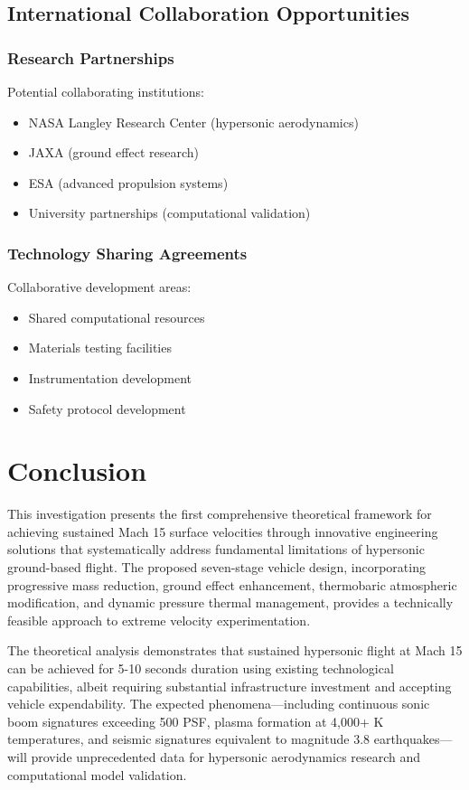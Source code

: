\documentclass[12pt,a4paper]{article}
\begin{document}
\subsection{International Collaboration Opportunities}

\subsubsection{Research Partnerships}
Potential collaborating institutions:
\begin{itemize}
\item NASA Langley Research Center (hypersonic aerodynamics)
\item JAXA (ground effect research)
\item ESA (advanced propulsion systems)
\item University partnerships (computational validation)
\end{itemize}

\subsubsection{Technology Sharing Agreements}
Collaborative development areas:
\begin{itemize}
\item Shared computational resources
\item Materials testing facilities
\item Instrumentation development
\item Safety protocol development
\end{itemize}

\section{Conclusion}

This investigation presents the first comprehensive theoretical framework for achieving sustained Mach 15 surface velocities through innovative engineering solutions that systematically address fundamental limitations of hypersonic ground-based flight. The proposed seven-stage vehicle design, incorporating progressive mass reduction, ground effect enhancement, thermobaric atmospheric modification, and dynamic pressure thermal management, provides a technically feasible approach to extreme velocity experimentation.

The theoretical analysis demonstrates that sustained hypersonic flight at Mach 15 can be achieved for 5-10 seconds duration using existing technological capabilities, albeit requiring substantial infrastructure investment and accepting vehicle expendability. The expected phenomena—including continuous sonic boom signatures exceeding 500 PSF, plasma formation at 4,000+ K temperatures, and seismic signatures equivalent to magnitude 3.8 earthquakes—will provide unprecedented data for hypersonic aerodynamics research and computational model validation.
\end{document}
